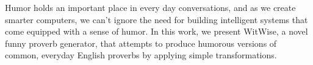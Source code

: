 Humor holds an important place in every day conversations, and as we create smarter computers, we can't ignore the need for building intelligent systems that come equipped with a sense of humor. In this work, we present WitWise, a novel funny proverb generator, that attempts to produce humorous versions of common, everyday English proverbs by applying simple transformations.
